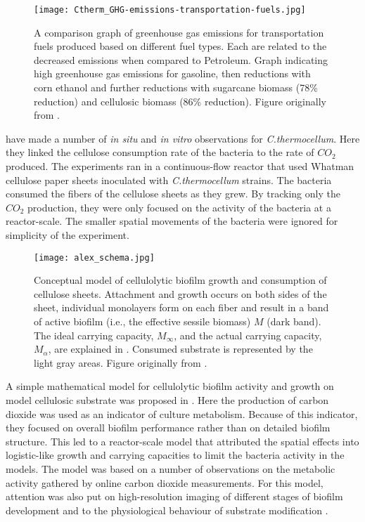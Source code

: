 \begin{figure}[!htp]
  \centering
  \texttt{[image: Ctherm\_GHG-emissions-transportation-fuels.jpg]}
  \caption{A comparison graph of greenhouse gas emissions for transportation fuels produced based on different fuel types.
    Each are related to the decreased emissions when compared to Petroleum.
    Graph indicating high greenhouse gas emissions for gasoline, then reductions with corn ethanol and further reductions with sugarcane biomass (78\% reduction) and cellulosic biomass (86\% reduction).
    Figure originally from \cite{afdc2007emission}.
  }
  \label{fig:emissions}
\end{figure}

\cite{dumitrache2015mathematicalModeling} have made a number of \textit{in situ} and \textit{in vitro} observations for \textit{C.thermocellum}.
Here they linked the cellulose consumption rate of the bacteria to the rate of $CO_2$ produced.
The experiments ran in a continuous-flow reactor that used Whatman cellulose paper sheets inoculated with \textit{C.thermocellum} strains.
The bacteria consumed the fibers of the cellulose sheets as they grew.
By tracking only the $CO_2$ production, they were only focused on the activity of the bacteria at a reactor-scale.
The smaller spatial movements of the bacteria were ignored for simplicity of the experiment.

\begin{figure}[!htpp]
  \centering
  \texttt{[image: alex\_schema.jpg]}
  \caption{Conceptual model of cellulolytic biofilm growth and consumption of cellulose sheets. 
    Attachment and growth occurs on both sides of the sheet, individual monolayers form on each fiber and result in a band of active biofilm (i.e., the effective sessile biomass) $M$ (dark band). 
    The ideal carrying capacity, $M_{\infty}$, and the actual carrying capacity, $M_{\alpha}$, are explained in \cite{dumitrache2015mathematicalModeling}.
    Consumed substrate is represented by the light gray areas.
    Figure originally from \cite{dumitrache2015mathematicalModeling}.
  }
  \label{fig:alex_schema}
\end{figure}

A simple mathematical model for cellulolytic biofilm activity and growth on model cellulosic substrate was proposed in \cite{dumitrache2015mathematicalModeling}. 
Here the production of carbon dioxide was used as an indicator of culture metabolism.
Because of this indicator, they focused on overall biofilm performance rather than on detailed biofilm structure.
This led to a reactor-scale model that attributed the spatial effects into logistic-like growth and carrying capacities to limit the bacteria activity in the models.
The model was based on a number of observations on the metabolic activity gathered by online carbon dioxide measurements.
For this model, attention was also put on high-resolution imaging of different stages of biofilm development \citep{dumitrache2013formFunction} and to the physiological behaviour of substrate modification \citep{dumitrache2013tracking}.

